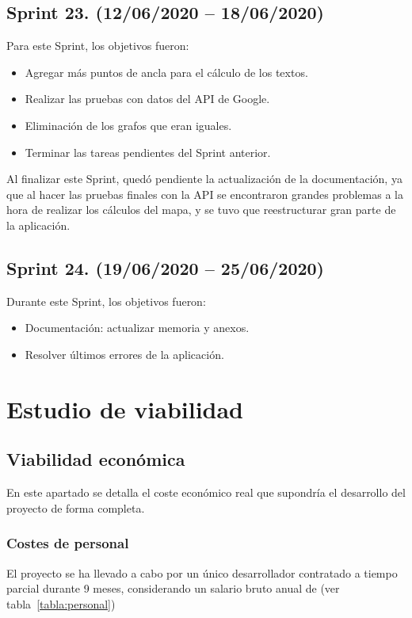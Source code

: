 \subsection{Sprint 23. (12/06/2020 -- 18/06/2020)}
Para este Sprint, los objetivos fueron:
\begin{itemize}
	\item Agregar más puntos de ancla para el cálculo de los textos.
	\item Realizar las pruebas con datos del API de Google.
	\item Eliminación de los grafos que eran iguales.
	\item Terminar las tareas pendientes del Sprint anterior.
\end{itemize}

Al finalizar este Sprint, quedó pendiente la actualización de la documentación, ya que al hacer las pruebas finales con la API se encontraron grandes problemas a la hora de realizar los cálculos del mapa, y se tuvo que reestructurar gran parte de la aplicación.

\subsection{Sprint 24. (19/06/2020 -- 25/06/2020)}
Durante este Sprint, los objetivos fueron:
\begin{itemize}
	\item Documentación: actualizar memoria y anexos.
	\item Resolver últimos errores de la aplicación.
\end{itemize}


\section{Estudio de viabilidad}

\subsection{Viabilidad económica}
En este apartado se detalla el coste económico real que supondría el desarrollo del proyecto de forma completa.

\subsubsection{Costes de personal}
El proyecto se ha llevado a cabo por un único desarrollador contratado a tiempo parcial durante 9 meses, considerando un salario  bruto anual de  (ver tabla~\ref{tabla:personal})


